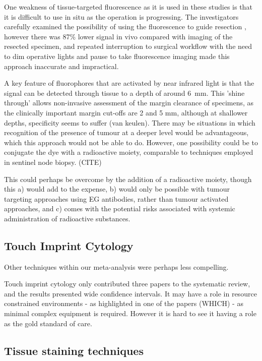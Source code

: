 One weakness of tissue-targeted fluorescence as it is used in these studies is that it is difficult to use in situ as the operation is progressing. 
The investigators carefully examined the possibility of using the fluorescence to guide resection \cite{mooreCharacterizingUtilityLimitations2017}, however there was 87\% lower signal in vivo compared with imaging of the resected specimen, and repeated interruption to surgical workflow with the need to dim operative lights and pause to take fluorescence imaging made this approach inaccurate and impractical. 

A key feature of fluorophores that are activated by near infrared light is that the signal can be detected through tissue to a depth of around \SI{6}{\milli\meter}.
This 'shine through' allows non-invasive assessment of the margin clearance of specimens, as the clinically important margin cut-offs are 2 and 5 mm, although at shallower depths, specificity seems to suffer (van keulen).
There may be situations in which recognition of the presence of tumour at a deeper level would be advantageous, which this approach would not be able to do.
However, one possibility could be to conjugate the dye with a radioactive moiety, comparable to techniques employed in sentinel node biopsy. (CITE)

This could perhaps be overcome by the addition of a radioactive moiety, though this a) would add to the expense, b) would only be possible with tumour targeting approaches using EG antibodies, rather than tumour activated approaches, and c) comes with the potential risks associated with systemic administration of radioactive substances.

\subsection{Touch Imprint Cytology}

Other techniques within our meta-analysis were perhaps less compelling.

Touch imprint cytology only contributed three papers to the systematic review, and the results presented wide confidence intervals. 
It may have a role in resource constrained environments - as highlighted in one of the papers (WHICH) - as minimal complex equipment is required. 
However it is hard to see it having a role as the gold standard of care.

\subsection{Tissue staining techniques}


